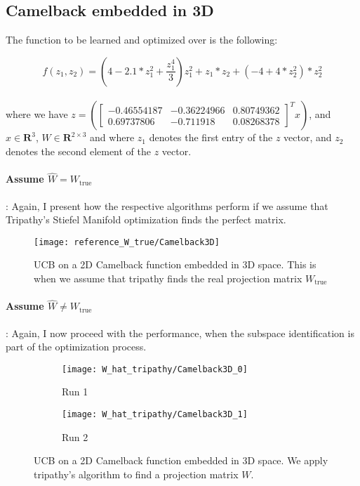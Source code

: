 \subsection{Camelback embedded in 3D}

The function to be learned and optimized over is the following:

\def\WCamelback3D{
\begin{bmatrix}
    -0.46554187 & -0.36224966 & 0.80749362 \\
     0.69737806 & -0.711918 & 0.08268378
\end{bmatrix}}

\begin{equation}
f(z_1, z_2) = \left( 4 - 2.1 * z_1^2 + \frac{z_1^4}{3} \right)  z_1^2 + z_1 *  z_2 + \left(-4 + 4 * z_2^2 \right) * z_2^2
\end{equation} \\

where we have $z = \left( \WCamelback3D^T x \right) $, and $ x \in \mathbf{R}^3$, $W \in \mathbf{R}^{2 \times 3}$ and where $z_1$ denotes the first entry of the $z$ vector, and $z_2$ denotes the second element of the $z$ vector.

\paragraph{Assume $\hat{W} = W_{\text{true}}$}: Again, I present how the respective algorithms perform if we assume that Tripathy's Stiefel Manifold optimization finds the perfect matrix.

\begin{figure}[H]
  \centering
      \texttt{[image: reference\_W\_true/Camelback3D]}
  \caption{UCB on a 2D Camelback function embedded in 3D space.
  This is when we assume that tripathy finds the real projection matrix $W_{\text{true}}$}
\end{figure}

\paragraph{Assume $\hat{W} \neq W_{\text{true}}$}: Again, I now proceed with the performance, when the subspace identification is part of the optimization process.

\begin{figure}[H]
    \centering
    \begin{subfigure}[b]{0.40\textwidth}
        \texttt{[image: W\_hat\_tripathy/Camelback3D\_0]}
        \label{fig:gull}
        \caption{Run 1}
    \end{subfigure}
    \begin{subfigure}[b]{0.40\textwidth}
        \texttt{[image: W\_hat\_tripathy/Camelback3D\_1]}
        \label{fig:tiger}
        \caption{Run 2}
    \end{subfigure}   
        \caption{UCB on a 2D Camelback function embedded in 3D space.
  		We apply tripathy's algorithm to find a projection matrix $W$.}
\end{figure}

